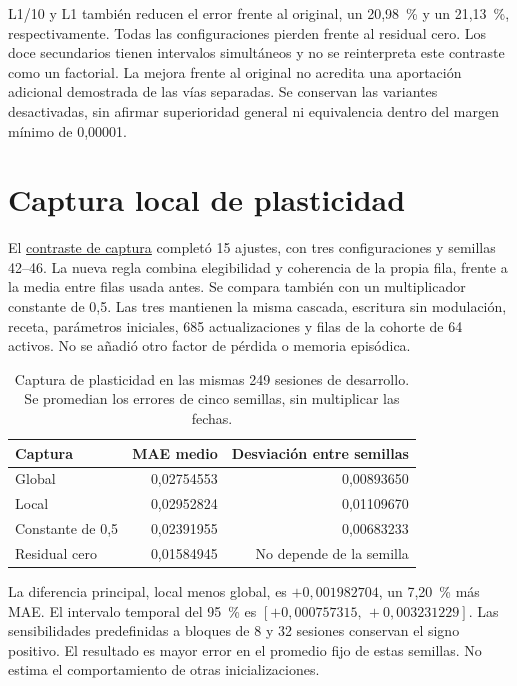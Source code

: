 \documentclass[11pt,a4paper]{report}
\begin{document}
L1/10 y L1 también reducen el error frente al original, un 20,98~\% y un
21,13~\%, respectivamente. Todas las configuraciones pierden frente al
residual cero. Los doce secundarios tienen intervalos simultáneos y no se
reinterpreta este contraste como un factorial. La mejora frente al original
no acredita una aportación adicional demostrada de las vías separadas.
Se conservan las variantes desactivadas, sin afirmar superioridad general
ni equivalencia dentro del margen mínimo de 0,00001.

\section{Captura local de plasticidad}
El \href{https://github.com/GonxKZ/mars-titan/tree/develop/reports/research/local-capture-20261020/development-v1}{contraste de captura}
completó 15 ajustes, con tres configuraciones y semillas 42--46. La nueva
regla combina elegibilidad y coherencia de la propia fila, frente a la media
entre filas usada antes. Se compara también con un multiplicador constante
de 0,5. Las tres mantienen la misma cascada, escritura sin modulación,
receta, parámetros iniciales, 685 actualizaciones y filas de la cohorte
de 64 activos. No se añadió otro factor de pérdida o memoria episódica.

\begin{table}[htbp]
\centering
\small
\begin{tabular}{lrr}
\toprule
Captura & MAE medio & Desviación entre semillas \\
\midrule
Global & 0,02754553 & 0,00893650 \\
Local & 0,02952824 & 0,01109670 \\
Constante de 0,5 & 0,02391955 & 0,00683233 \\
Residual cero & 0,01584945 & No depende de la semilla \\
\bottomrule
\end{tabular}
\caption{Captura de plasticidad en las mismas 249 sesiones de desarrollo.
Se promedian los errores de cinco semillas, sin multiplicar las fechas.}
\end{table}

La diferencia principal, local menos global, es $+0{,}001982704$, un
7,20~\% más MAE. El intervalo temporal del 95~\% es
$[+0{,}000757315,\,+0{,}003231229]$. Las sensibilidades predefinidas a
bloques de 8 y 32 sesiones conservan el signo positivo. El resultado
es mayor error en el promedio fijo de estas semillas. No estima el
comportamiento de otras inicializaciones.
\end{document}
